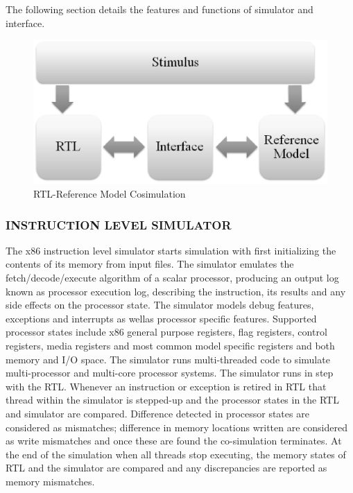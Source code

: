 The following section details the features and functions of simulator and interface. 



\begin{figure}[H]
\centering
\includegraphics[width=4.5in]{./figures/interface.eps}
\caption{RTL-Reference Model Cosimulation} 
\label{fig:interface.eps}
\end{figure}





\subsubsection {INSTRUCTION LEVEL SIMULATOR}
The x86 instruction level simulator starts simulation with first initializing the contents of its memory from input files. The simulator emulates the fetch/decode/execute algorithm of a scalar processor, producing an output log known as processor execution log, describing the instruction, its results and any side effects on the processor state. The simulator models debug features, exceptions and interrupts as wellas processor specific features. Supported processor states include x86 general purpose registers, flag registers, control registers, media registers and most common model specific registers and both memory and I/O space. The simulator runs multi-threaded code to simulate multi-processor and multi-core processor systems. 
The simulator runs in step with the RTL. Whenever an instruction or exception is retired in RTL that thread within the simulator is stepped-up and the processor states in the RTL and simulator are compared. Difference detected in processor states are considered as mismatches; difference in memory locations written are considered as write mismatches and once these are found the co-simulation terminates. At the end of the simulation when all threads stop executing, the memory states of RTL and the simulator are compared and any discrepancies are reported as memory mismatches.

